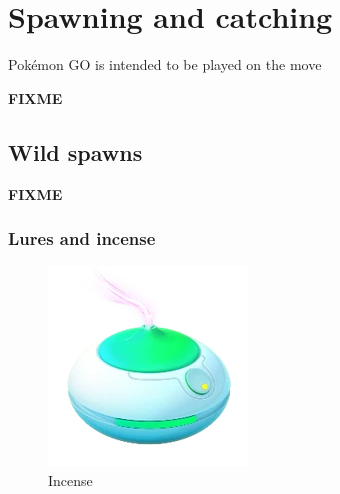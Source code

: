 \chapter{Spawning and catching}
Pokémon GO is intended to be played on the move

\label{chap:spawn}
\textbf{FIXME}

\section{Wild spawns}
\label{sec:spawns}
\textbf{FIXME}

\subsection{Lures and incense}
\begin{figure}[h]
  \begin{minipage}[t]{0.3\textwidth}
    \begin{center}
    \includegraphics[width=\textwidth]{images/incense.png}
    \end{center}
    \caption*{Incense}
    \label{fig:lure}
  \end{minipage}
  \begin{minipage}[t]{0.3\textwidth}
    \begin{center}

\end{center}
\end{minipage}
\end{figure}
